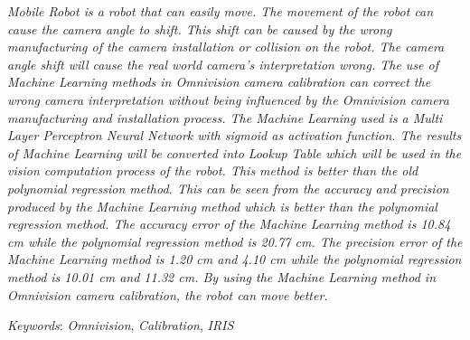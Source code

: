 \emph{Mobile Robot is a robot that can easily move. The movement of the robot can cause the camera angle to shift. This shift can be caused by the wrong manufacturing of the camera installation or collision on the robot. The camera angle shift will cause the real world camera's interpretation wrong. The use of Machine Learning methods in Omnivision camera calibration can correct the wrong camera interpretation without being influenced by the Omnivision camera manufacturing and installation process. The Machine Learning used is a Multi Layer Perceptron Neural Network with sigmoid as activation function. The results of Machine Learning will be converted into Lookup Table which will be used in the vision computation process of the robot. This method is better than the old polynomial regression method. This can be seen from the accuracy and precision produced by the Machine Learning method which is better than the polynomial regression method. The accuracy error of the Machine Learning method is 10.84 cm while the polynomial regression method is 20.77 cm. The precision error of the Machine Learning method is 1.20 cm and 4.10 cm while the polynomial regression method is 10.01 cm and 11.32 cm. By using the Machine Learning method in Omnivision camera calibration, the robot can move better.}

\emph{Keywords}: \emph{Omnivision}, \emph{Calibration}, \emph{IRIS}
